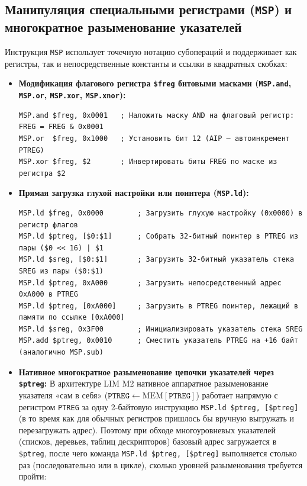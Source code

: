 \documentclass[11pt,a4paper]{article}
\newcommand{\reg}[1]{\texttt{#1}}
\begin{document}
\subsection{Манипуляция специальными регистрами (\texttt{MSP}) и многократное разыменование указателей}
Инструкция \texttt{MSP} использует точечную нотацию субопераций и поддерживает как регистры, так и непосредственные константы и ссылки в квадратных скобках:
\begin{itemize}
  \item \textbf{Модификация флагового регистра \texttt{\$freg} битовыми масками (\texttt{MSP.and}, \texttt{MSP.or}, \texttt{MSP.xor}, \texttt{MSP.xnor}):}
\begin{verbatim}
MSP.and $freg, 0x0001   ; Наложить маску AND на флаговый регистр: FREG = FREG & 0x0001
MSP.or  $freg, 0x1000   ; Установить бит 12 (AIP — автоинкремент PTREG)
MSP.xor $freg, $2       ; Инвертировать биты FREG по маске из регистра $2
\end{verbatim}
  \item \textbf{Прямая загрузка глухой настройки или поинтера (\texttt{MSP.ld}):}
\begin{verbatim}
MSP.ld $freg, 0x0000        ; Загрузить глухую настройку (0x0000) в регистр флагов
MSP.ld $ptreg, [$0:$1]      ; Собрать 32-битный поинтер в PTREG из пары ($0 << 16) | $1
MSP.ld $sreg, [$0:$1]       ; Загрузить 32-битный указатель стека SREG из пары ($0:$1)
MSP.ld $ptreg, 0xA000       ; Загрузить непосредственный адрес 0xA000 в PTREG
MSP.ld $ptreg, [0xA000]     ; Загрузить в PTREG поинтер, лежащий в памяти по ссылке [0xA000]
MSP.ld $sreg, 0x3F00        ; Инициализировать указатель стека SREG
MSP.add $ptreg, 0x0010      ; Сместить указатель PTREG на +16 байт (аналогично MSP.sub)
\end{verbatim}
  \item \textbf{Нативное многократное разыменование цепочки указателей через \texttt{\$ptreg}:}
  В архитектуре LIM M2 нативное аппаратное разыменование указателя «сам в себя» ($\reg{PTREG} \leftarrow \text{MEM}[\reg{PTREG}]$) работает напрямую с регистром \reg{PTREG} за одну 2-байтовую инструкцию \texttt{MSP.ld \$ptreg, [\$ptreg]} (в то время как для обычных регистров пришлось бы вручную выгружать и перезагружать адрес). Поэтому при обходе многоуровневых указателей (списков, деревьев, таблиц дескрипторов) базовый адрес загружается в \texttt{\$ptreg}, после чего команда \texttt{MSP.ld \$ptreg, [\$ptreg]} выполняется столько раз (последовательно или в цикле), сколько уровней разыменования требуется пройти:
\begin{verbatim}

\end{verbatim}
\end{itemize}
\end{document}
